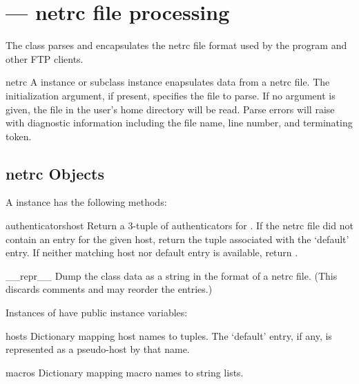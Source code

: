 \section{ ---
         netrc file processing}




The  class parses and encapsulates the netrc file format
used by the \UNIX{}  program and other FTP clients.

\begin{classdesc}{netrc}{}
A  instance or subclass instance enapsulates data from 
a netrc file.  The initialization argument, if present, specifies the
file to parse.  If no argument is given, the file  in the
user's home directory will be read.  Parse errors will raise
 with diagnostic information including the file 
name, line number, and terminating token.
\end{classdesc}


\subsection{netrc Objects \label{netrc-objects}}

A  instance has the following methods:

\begin{methoddesc}{authenticators}{host}
Return a 3-tuple 
of authenticators for .  If the netrc file did not
contain an entry for the given host, return the tuple associated with
the `default' entry.  If neither matching host nor default entry is
available, return .
\end{methoddesc}

\begin{methoddesc}{__repr__}{}
Dump the class data as a string in the format of a netrc file.
(This discards comments and may reorder the entries.)
\end{methoddesc}

Instances of  have public instance variables:

\begin{memberdesc}{hosts}
Dictionary mapping host names to  tuples.  The `default' entry, if any, is represented
as a pseudo-host by that name.
\end{memberdesc}

\begin{memberdesc}{macros}
Dictionary mapping macro names to string lists.
\end{memberdesc}
